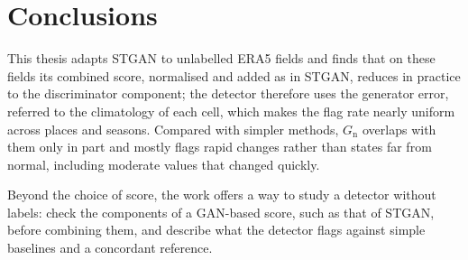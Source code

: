 \documentclass[11pt,a4paper]{article}
\newcommand{\Gn}{$G_{\mathrm{n}}$}
\begin{document}
\section{Conclusions}

This thesis adapts STGAN to unlabelled ERA5 fields and finds that on these fields its combined score, normalised and added as in STGAN, reduces in practice to the discriminator component; the detector therefore uses the generator error, referred to the climatology of each cell, which makes the flag rate nearly uniform across places and seasons. Compared with simpler methods, \Gn{} overlaps with them only in part and mostly flags rapid changes rather than states far from normal, including moderate values that changed quickly.

Beyond the choice of score, the work offers a way to study a detector without labels: check the components of a GAN-based score, such as that of STGAN, before combining them, and describe what the detector flags against simple baselines and a concordant reference.
\end{document}
